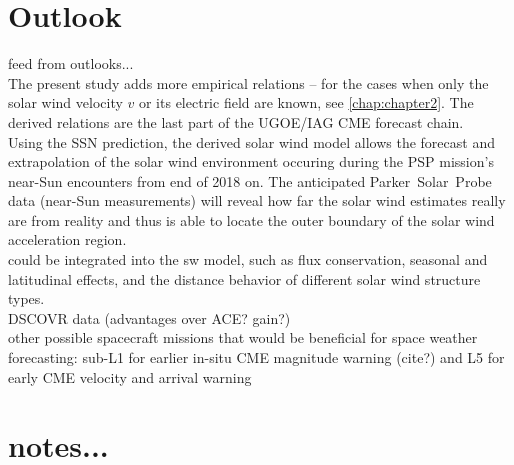 \section{Outlook}

feed from outlooks...\\

The present study adds more empirical \Kp{} relations -- for the cases when only the solar wind velocity $v$ or its electric field \vBz{} are known, see \autoref{chap:chapter2}. The derived \Kp{} relations are the last part of the UGOE/IAG CME forecast chain.\\

Using the SSN prediction, the derived solar wind model allows the forecast and extrapolation of the solar wind environment occuring during the PSP mission's near-Sun encounters from end of 2018 on. The anticipated Parker~Solar~Probe data (near-Sun measurements) will reveal how far the solar wind estimates really are from reality and thus is able to locate the outer boundary of the solar wind acceleration region.\\

could be integrated into the sw model, such as flux conservation, seasonal and latitudinal effects, and the distance behavior of different solar wind structure types.\\

DSCOVR data (advantages over ACE? gain?)\\

other possible spacecraft missions that would be beneficial for space weather forecasting: sub-L1 for earlier in-situ CME magnitude warning (cite?) and L5 for early CME velocity and arrival warning \citep{Vourlidas2015}\\








\section{notes...}

